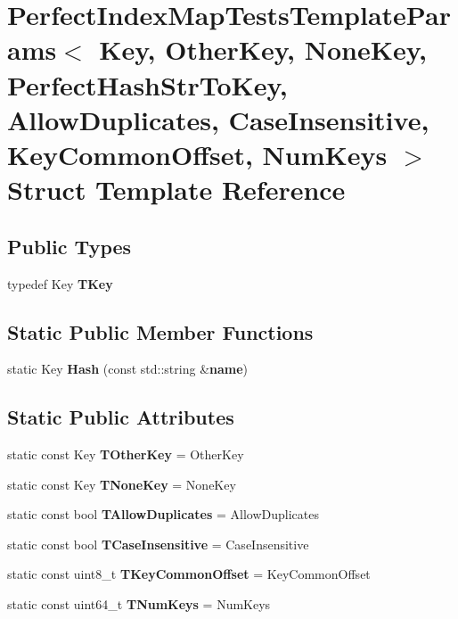 \section{Perfect\+Index\+Map\+Tests\+Template\+Params$<$ Key, Other\+Key, None\+Key, Perfect\+Hash\+Str\+To\+Key, Allow\+Duplicates, Case\+Insensitive, Key\+Common\+Offset, Num\+Keys $>$ Struct Template Reference}
\label{structPerfectIndexMapTestsTemplateParams}
\subsection*{Public Types}
\begin{DoxyCompactItemize}
\item 
typedef Key {\bf T\+Key}
\end{DoxyCompactItemize}
\subsection*{Static Public Member Functions}
\begin{DoxyCompactItemize}
\item 
static Key {\bf Hash} (const std\+::string \&{\bf name})
\end{DoxyCompactItemize}
\subsection*{Static Public Attributes}
\begin{DoxyCompactItemize}
\item 
static const Key {\bf T\+Other\+Key} = Other\+Key
\item 
static const Key {\bf T\+None\+Key} = None\+Key
\item 
static const bool {\bf T\+Allow\+Duplicates} = Allow\+Duplicates
\item 
static const bool {\bf T\+Case\+Insensitive} = Case\+Insensitive
\item 
static const uint8\+\_\+t {\bf T\+Key\+Common\+Offset} = Key\+Common\+Offset
\item 
static const uint64\+\_\+t {\bf T\+Num\+Keys} = Num\+Keys
\end{DoxyCompactItemize}


